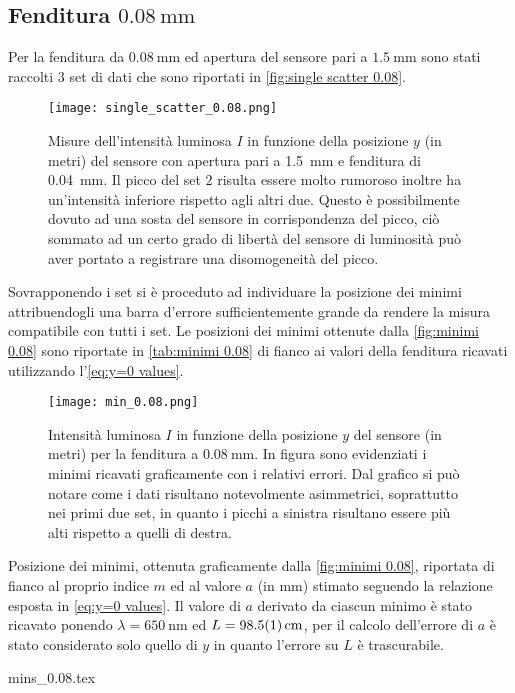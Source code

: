 \documentclass[../main.tex]{subfiles}
\begin{document}
\subsection{Fenditura $\qty{0.08}{\milli\metre}$}

Per la fenditura da $\qty{0.08}{\mm}$ ed apertura del sensore pari a $\qty{1.5}{\mm}$ sono stati raccolti $3$ set di dati che sono riportati in \autoref{fig:single scatter 0.08}.

\begin{figure}[ht!]
    \centering
    \texttt{[image: single\_scatter\_0.08.png]}
    \caption{Misure dell'intensità luminosa $I$ in funzione della posizione $y$ (in metri) del sensore con apertura pari a \qty{1.5}{\mm} e fenditura di \qty{0.04}{\mm}. Il picco del set $2$ risulta essere molto rumoroso inoltre ha un'intensità inferiore rispetto agli altri due. Questo è possibilmente dovuto ad una sosta del sensore in corrispondenza del picco, ciò sommato ad un certo grado di libertà del sensore di luminosità può aver portato a registrare una disomogeneità del picco.}
    \label{fig:single scatter 0.08}
\end{figure}

Sovrapponendo i set si è proceduto ad individuare la posizione dei minimi attribuendogli una barra d'errore sufficientemente grande da rendere la misura compatibile con tutti i set. Le posizioni dei minimi ottenute dalla \autoref{fig:minimi 0.08} sono riportate in \autoref{tab:minimi 0.08} di fianco ai valori della fenditura ricavati utilizzando l'\autoref{eq:y=0 values}.

\begin{figure}[ht!]
    \centering
    \texttt{[image: min\_0.08.png]}
    \caption{Intensità luminosa $I$ in funzione della posizione $y$ del sensore (in metri) per la fenditura a $\qty{0.08}{\mm}$. In figura sono evidenziati i minimi ricavati graficamente con i relativi errori. Dal grafico si può notare come i dati risultano notevolmente asimmetrici, soprattutto nei primi due set, in quanto i picchi a sinistra risultano essere più alti rispetto a quelli di destra.} %
    \label{fig:minimi 0.08}
\end{figure}

\begin{table}[ht!]
    \centering
    \caption{Posizione dei minimi, ottenuta graficamente dalla \autoref{fig:minimi 0.08}, riportata di fianco al proprio indice $m$ ed al valore $a$ (in $\si{\mm}$) stimato seguendo la relazione esposta in \autoref{eq:y=0 values}. Il valore di $a$ derivato da ciascun minimo è stato ricavato ponendo $\lambda = \qty{650}{\nm}$ ed $L = \qty{98.5+-0.1}{\cm}$, per il calcolo dell'errore di $a$ è stato considerato solo quello di $y$ in quanto l'errore su $L$ è trascurabile.}
    {mins_0.08.tex}
    \label{tab:minimi 0.08}
\end{table}
\end{document}
